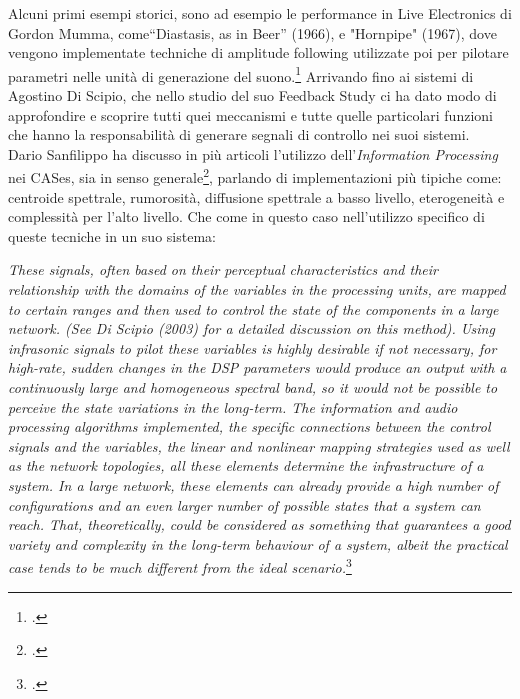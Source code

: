 Alcuni primi esempi storici,
sono ad esempio le performance in Live Electronics di Gordon Mumma, 
come“Diastasis, as in Beer” (1966), e "Hornpipe" (1967), 
dove vengono implementate techniche di amplitude following utilizzate 
poi per pilotare parametri nelle unità di generazione del suono.\footcite{sanfilippo_time-domain_2021}
Arrivando fino ai sistemi di Agostino Di Scipio, che nello studio del suo
Feedback Study ci ha dato modo di approfondire e scoprire
tutti quei meccanismi e tutte quelle particolari funzioni che hanno la responsabilità
di generare segnali di controllo nei suoi sistemi. \\
Dario Sanfilippo ha discusso in più articoli l'utilizzo dell'\textit{Information Processing} 
nei CASes, sia in senso generale\footcite{sanfilippo_time-domain_2021}, 
parlando di implementazioni più tipiche come: 
centroide spettrale, rumorosità, diffusione spettrale a basso livello, eterogeneità e
complessità per l'alto livello.
Che come in questo caso nell'utilizzo specifico di queste tecniche 
in un suo sistema:

\begin{center}
    \vspace{0.5cm}
    \textit{These signals, often based on
    their perceptual characteristics and their relationship with the domains of the variables
    in the processing units, are mapped to certain ranges and then used to control the state
    of the components in a large network. (See Di Scipio (2003) for a detailed discussion
    on this method). Using infrasonic signals to pilot these variables is highly desirable if
    not necessary, for high-rate, sudden changes in the DSP parameters would produce an
    output with a continuously large and homogeneous spectral band, so it would not be
    possible to perceive the state variations in the long-term.
    The information and audio processing algorithms implemented, the specific connections 
    between the control signals and the variables, the linear and nonlinear mapping strategies 
    used as well as the network topologies, all these elements determine the
    infrastructure of a system. In a large network, these elements can already provide a high
    number of configurations and an even larger number of possible states that a system
    can reach. That, theoretically, could be considered as something that guarantees a good
    variety and complexity in the long-term behaviour of a system, albeit the practical case
    tends to be much different from the ideal scenario.}\footcite{sanfilippo_time-variant_2018}
    \vspace{0.5cm}
\end{center}

